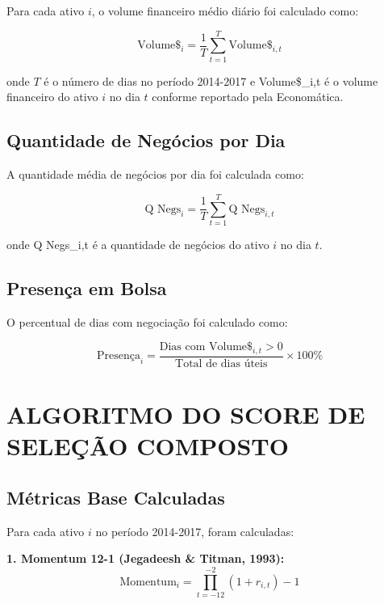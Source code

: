 Para cada ativo $i$, o volume financeiro médio diário foi calculado como:

\begin{equation}
\text{Volume}\$_{i} = \frac{1}{T} \sum_{t=1}^{T} \text{Volume}\$_{i,t}
\end{equation}

onde $T$ é o número de dias no período 2014-2017 e Volume\$_{i,t} é o volume financeiro do ativo $i$ no dia $t$ conforme reportado pela Economática.

\subsection{Quantidade de Negócios por Dia}

A quantidade média de negócios por dia foi calculada como:

\begin{equation}
\text{Q Negs}_{i} = \frac{1}{T} \sum_{t=1}^{T} \text{Q Negs}_{i,t}
\end{equation}

onde Q Negs_{i,t} é a quantidade de negócios do ativo $i$ no dia $t$.

\subsection{Presença em Bolsa}

O percentual de dias com negociação foi calculado como:

\begin{equation}
\text{Presença}_{i} = \frac{\text{Dias com Volume}\$_{i,t} > 0}{\text{Total de dias úteis}} \times 100\%
\end{equation}

\section{ALGORITMO DO SCORE DE SELEÇÃO COMPOSTO}

\subsection{Métricas Base Calculadas}

Para cada ativo $i$ no período 2014-2017, foram calculadas:

\textbf{1. Momentum 12-1 (Jegadeesh \& Titman, 1993):}
\begin{equation}
\text{Momentum}_{i} = \prod_{t=-12}^{-2}(1 + r_{i,t}) - 1
\end{equation}

